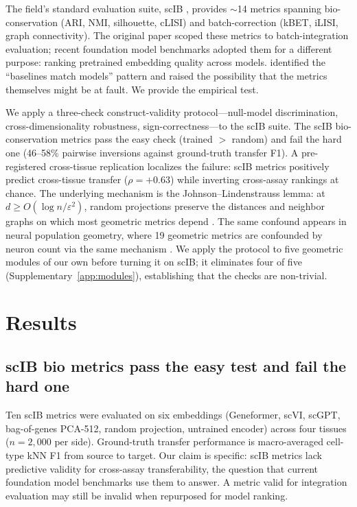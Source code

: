 \documentclass[11pt]{article}
\begin{document}
The field's standard evaluation suite, scIB \citep{luecken2022scib}, provides $\sim$14 metrics spanning bio-conservation (ARI, NMI, silhouette, cLISI) and batch-correction (kBET, iLISI, graph connectivity). The original paper scoped these metrics to batch-integration evaluation; recent foundation model benchmarks \citep{wu2025scfm, vcbench2026, unifiedscfm2026, cellxgeneintegration2026} adopted them for a different purpose: ranking pretrained embedding quality across models. \citet{wu2025scfm} identified the ``baselines match models'' pattern and raised the possibility that the metrics themselves might be at fault. We provide the empirical test.

We apply a three-check construct-validity protocol---null-model discrimination, cross-dimensionality robustness, sign-correctness---to the scIB suite. The scIB bio-conservation metrics pass the easy check (trained $>$ random) and fail the hard one (46--58\% pairwise inversions against ground-truth transfer F1). A pre-registered cross-tissue replication localizes the failure: scIB metrics positively predict cross-tissue transfer ($\rho = +0.63$) while inverting cross-assay rankings at chance. The underlying mechanism is the Johnson--Lindenstrauss lemma: at $d \geq O(\log n / \varepsilon^2)$, random projections preserve the distances and neighbor graphs on which most geometric metrics depend \citep{johnsonlindenstrauss1984}. The same confound appears in neural population geometry, where 19 geometric metrics are confounded by neuron count via the same mechanism \citep{tower2026bracket}. We apply the protocol to five geometric modules of our own before turning it on scIB; it eliminates four of five (Supplementary~\ref{app:modules}), establishing that the checks are non-trivial.


\section{Results}

\subsection{scIB bio metrics pass the easy test and fail the hard one}
\label{sec:scib}

Ten scIB metrics were evaluated on six embeddings (Geneformer, scVI, scGPT, bag-of-genes PCA-512, random projection, untrained encoder) across four tissues ($n = 2{,}000$ per side). Ground-truth transfer performance is macro-averaged cell-type kNN F1 from source to target. Our claim is specific: scIB metrics lack predictive validity for cross-assay transferability, the question that current foundation model benchmarks use them to answer. A metric valid for integration evaluation may still be invalid when repurposed for model ranking.
\end{document}
